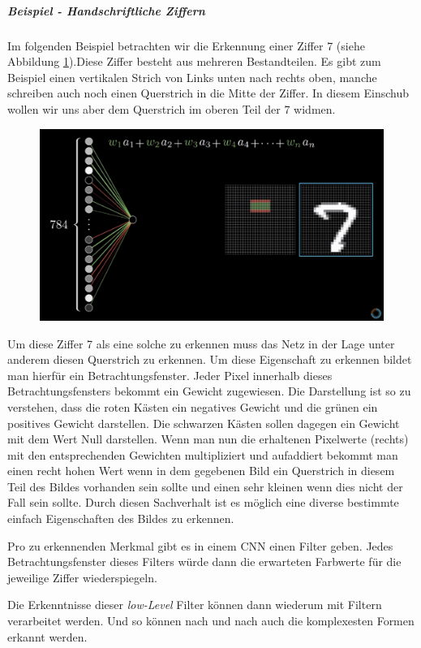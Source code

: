 \subparagraph{Beispiel - Handschriftliche Ziffern}
Im folgenden Beispiel betrachten wir die Erkennung einer Ziffer 7 (siehe Abbildung \ref{fig:cnn_filter}).Diese Ziffer besteht aus mehreren Bestandteilen. Es gibt zum Beispiel einen vertikalen Strich von Links unten nach rechts oben, manche schreiben auch noch einen Querstrich in die Mitte der Ziffer. In diesem Einschub wollen wir uns aber dem Querstrich im oberen Teil der 7 widmen. 

\begin{figure}[!htb]
	\centering
	\includegraphics[width=.7\linewidth]{img/filter}
	\label{fig:cnn_filter}
\end{figure}

Um diese Ziffer 7 als eine solche zu erkennen muss das Netz in der Lage unter anderem diesen Querstrich zu erkennen. Um diese Eigenschaft zu erkennen bildet man hierfür ein Betrachtungsfenster. Jeder Pixel innerhalb dieses Betrachtungsfensters bekommt ein Gewicht zugewiesen. Die Darstellung ist so zu verstehen, dass die roten Kästen ein negatives Gewicht und die grünen ein positives Gewicht darstellen. Die schwarzen Kästen sollen dagegen ein Gewicht mit dem Wert Null darstellen. Wenn man nun die erhaltenen Pixelwerte (rechts) mit den entsprechenden Gewichten multipliziert und aufaddiert bekommt man einen recht hohen Wert wenn in dem gegebenen Bild ein Querstrich in diesem Teil des Bildes vorhanden sein sollte und einen sehr kleinen wenn dies nicht der Fall sein sollte. Durch diesen Sachverhalt ist es möglich eine diverse bestimmte einfach Eigenschaften des Bildes zu erkennen.  

Pro zu erkennenden Merkmal gibt es in einem CNN einen Filter geben. Jedes Betrachtungsfenster dieses Filters würde dann die erwarteten Farbwerte für die jeweilige Ziffer wiederspiegeln. 

Die Erkenntnisse dieser \emph{low-Level} Filter können dann wiederum mit Filtern verarbeitet werden. Und so können nach und nach auch die komplexesten Formen erkannt werden. 

